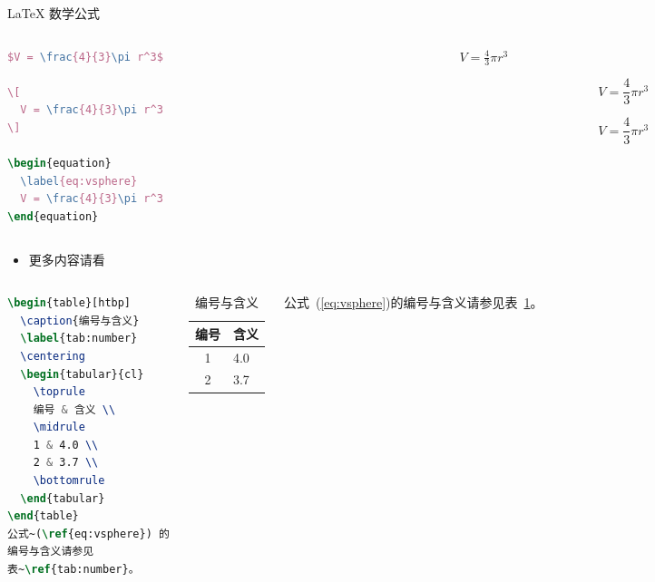 \documentclass{beamer}
\begin{document}
\begin{frame}[fragile]{\LaTeX{} 数学公式}

\begin{columns}
\begin{column}{.55\textwidth}
\begin{lstlisting}[language=TeX]
$V = \frac{4}{3}\pi r^3$

\[
  V = \frac{4}{3}\pi r^3
\]

\begin{equation}
  \label{eq:vsphere}
  V = \frac{4}{3}\pi r^3
\end{equation}
\end{lstlisting}
\end{column}

\begin{column}{.4\textwidth}
$V = \frac{4}{3}\pi r^3$

\[
	V = \frac{4}{3}\pi r^3
\]

\begin{equation}
\label{eq:vsphere}
V = \frac{4}{3}\pi r^3
\end{equation}
\end{column}
\end{columns}
\begin{itemize}
    \item 更多内容请看 \href{https://zh.wikipedia.org/wiki/Help:数学公式}{\color{purple}{这里}}
\end{itemize}
\end{frame}

\begin{frame}[fragile]
	\begin{columns}
	\begin{lstlisting}[language=TeX]
\begin{table}[htbp]
  \caption{编号与含义}
  \label{tab:number}
  \centering
  \begin{tabular}{cl}
    \toprule
    编号 & 含义 \\
    \midrule
    1 & 4.0 \\
    2 & 3.7 \\
    \bottomrule
  \end{tabular}
\end{table}
公式~(\ref{eq:vsphere}) 的
编号与含义请参见
表~\ref{tab:number}。
\end{lstlisting}
\begin{table}[htpb]
    \centering
    \caption{编号与含义}
    \label{tab:number}
    \begin{tabular}{cl}\toprule
    编号 & 含义 \\\midrule
    1 & 4.0\\
    2 & 3.7\\\bottomrule
    \end{tabular}
\end{table}

\normalsize 公式~(\ref{eq:vsphere})的编号与含义请参见表~\ref{tab:number}。
	\end{columns}
\end{frame}
\end{document}
